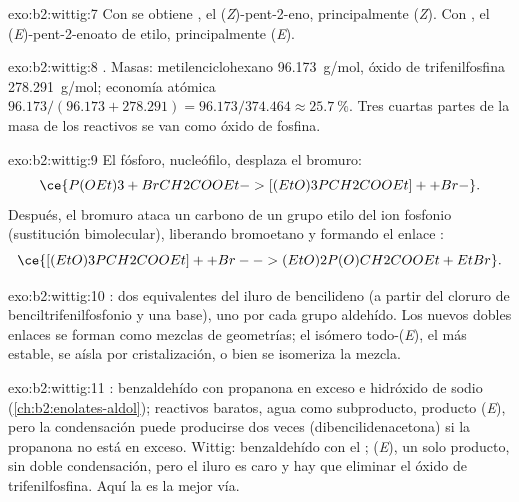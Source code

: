 \begin{solution}{exo:b2:wittig:7}
Con  se obtiene , el (\textit{Z})-pent-2-eno, principalmente (\textit{Z}).
Con , el (\textit{E})-pent-2-enoato de etilo, principalmente (\textit{E}).
\end{solution}

\begin{solution}{exo:b2:wittig:8}
. Masas: metilenciclohexano \qty{96.173}{g/mol},
óxido de trifenilfosfina \qty{278.291}{g/mol}; economía atómica $96.173/(96.173 + 278.291) =
96.173/374.464 \approx 25.7~\%$. Tres cuartas partes de la masa de los reactivos se van como óxido de fosfina.
\end{solution}

\begin{solution}{exo:b2:wittig:9}
El fósforo, nucleófilo, desplaza el bromuro:
\begin{equation*}
\ce{P(OEt)3 + BrCH2COOEt -> [(EtO)3PCH2COOEt]+ + Br-}.
\end{equation*}
Después, el bromuro
ataca un carbono de un grupo etilo del ion fosfonio (sustitución bimolecular), liberando
bromoetano y formando el enlace :
\begin{equation*}
\ce{[(EtO)3PCH2COOEt]+ + Br- -> (EtO)2P(O)CH2COOEt + EtBr}.
\end{equation*}
\end{solution}

\begin{solution}{exo:b2:wittig:10}
: dos equivalentes del
iluro de bencilideno (a partir del cloruro de benciltrifenilfosfonio y una base), uno por cada grupo aldehído.
Los nuevos dobles enlaces se forman como mezclas de geometrías; el isómero todo-(\textit{E}), el más
estable, se aísla por cristalización, o bien se isomeriza la mezcla.
\end{solution}

\begin{solution}{exo:b2:wittig:11}
: benzaldehído con propanona en exceso e hidróxido de sodio (\cref{ch:b2:enolates-aldol});
reactivos baratos, agua como subproducto, producto (\textit{E}), pero la condensación puede producirse dos veces
(dibencilidenacetona) si la propanona no está en exceso. Wittig: benzaldehído con el 
; (\textit{E}), un solo producto, sin doble condensación, pero el iluro es caro y
hay que eliminar el óxido de trifenilfosfina. Aquí la  es la mejor vía.
\end{solution}

